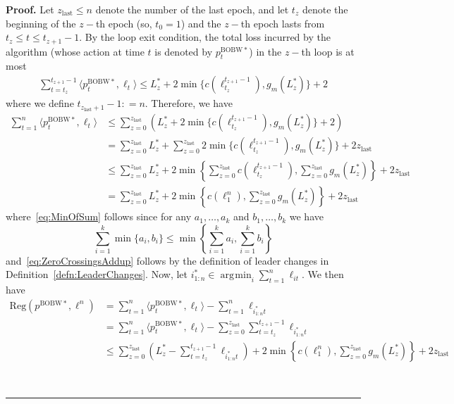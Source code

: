 \documentclass[11pt,letter]{article}
\newenvironment{proof}[1][Proof]{\noindent\textbf{#1.} }{\ \rule{0.5em}{0.5em}}
\newcommand{\defeq}{\mathrel{\mathop{:}}=}
\newcommand{\Reg}{\mathrm{Reg}}
\newcommand{\zlast}{z_{\mathrm{last}}}
\newcommand{\pstar}{p^{\mathrm{BOBW*}}}
\DeclareMathOperator*{\argmin}{\arg\!\min}
\begin{document}
\begin{proof}
    Let $\zlast \le n$ denote the number of the last epoch, and let $t_z$ denote the beginning of the $z-$th epoch (so, $t_0 = 1$) and the $z-$th epoch lasts from $t_z \le t \le t_{z+1}-1$. By the loop exit condition, the total loss incurred by the algorithm (whose action at time $t$ is denoted by $\pstar_t$) in the $z-$th loop is at most 
    \begin{align}\label{eq:LossInEpochUB}
        \sum_{t=t_z}^{t_{z+1}-1} \langle \pstar_t , \ell_t \rangle \le L^*_{z} + 2 \min\{c(\ell_{t_z}^{t_{z+1}-1}), g_m(L_z^*)\} + 2 
    \end{align}
    where we define $t_{\zlast+1}-1 \defeq n$. Therefore, we have 
    \begin{align}
        \sum_{t=1}^n \langle \pstar_t , \ell_t \rangle &\le \sum_{z=0}^{\zlast} \left(L^*_{z} + 2 \min\{c(\ell_{t_z}^{t_{z+1}-1}), g_m(L_z^*)\} + 2 \right) \nonumber\\
        &= \sum_{z=0}^{\zlast} L_z^* + \sum_{z=0}^{\zlast} 2 \min\{c(\ell_{t_z}^{t_{z+1}-1}), g_m(L_z^*)\} + 2\zlast \nonumber\\
        &\le  \sum_{z=0}^{\zlast} L_z^* + 2 \min\left\{\sum_{z=0}^{\zlast} c(\ell_{t_z}^{t_{z+1}-1}),  \sum_{z=0}^{\zlast} g_m(L_z^*)\right\} + 2\zlast \label{eq:MinOfSum} \\
        &=  \sum_{z=0}^{\zlast} L_z^* + 2 \min\left\{c(\ell_{1}^{n}),  \sum_{z=0}^{\zlast} g_m(L_z^*)\right\} + 2\zlast \label{eq:ZeroCrossingsAddup}  
    \end{align}
    where~\eqref{eq:MinOfSum} follows since for any $a_1,\dotsc,a_k$ and $b_1,\dotsc,b_k$ we have 
    \[
    \sum_{i=1}^k \min\{a_i,b_i\} \le \min\left\{\sum_{i=1}^k a_i, \sum_{i=1}^k b_i\right\}
    \]
    and~\eqref{eq:ZeroCrossingsAddup} follows by the definition of leader changes in Definition~\ref{defn:LeaderChanges}. Now, let $i^*_{1:n} \in \argmin_i \sum_{t=1}^n \ell_{it}$. We then have 
    \begin{align}
       \Reg(\pstar, \ell^n) &= \sum_{t=1}^n \langle \pstar_t, \ell_t \rangle - \sum_{t=1}^n \ell_{i^*_{1:n}t} \nonumber\\
       &= \sum_{t=1}^n \langle \pstar_t, \ell_t \rangle - \sum_{z=0}^{\zlast} \sum_{t = t_z}^{t_{z+1}-1} \ell_{i^*_{1:n}t} \nonumber\\
       &\le \sum_{z=0}^{\zlast}\left( L_z^* - \sum_{t = t_z}^{t_{z+1}-1} \ell_{i^*_{1:n}t}\right)  + 2 \min\left\{c(\ell_{1}^{n}),  \sum_{z=0}^{\zlast} g_m(L_z^*)\right\} + 2\zlast   \label{eq:EpochWiseLossUB}
    \end{align}

\end{proof}
\end{document}

